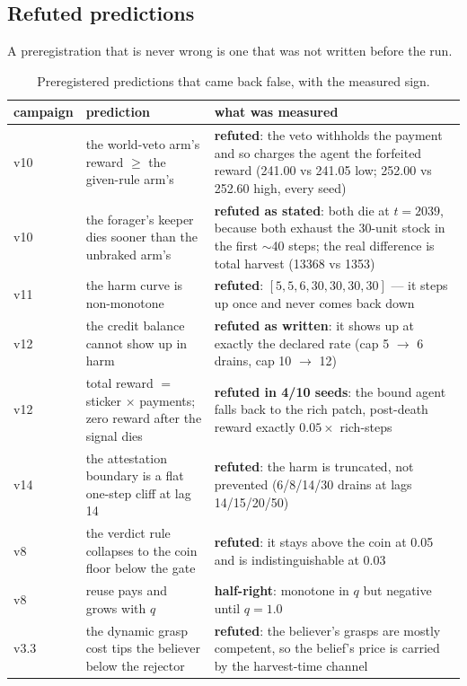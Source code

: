 \documentclass[11pt]{article}
\begin{document}
\subsection{Refuted predictions}

A preregistration that is never wrong is one that was not written before the run.

\begin{table}[t]
\centering
\small
\caption{Preregistered predictions that came back false, with the measured sign.}
\label{tab:refuted}
\begin{tabular}{p{}p{}p{}}
\toprule
campaign & prediction & what was measured \\
\midrule
v10 & the world-veto arm's reward $\ge$ the given-rule arm's & \textbf{refuted}: the veto withholds the payment and so charges the agent the forfeited reward (241.00 vs 241.05 low; 252.00 vs 252.60 high, every seed) \\
v10 & the forager's keeper dies sooner than the unbraked arm's & \textbf{refuted as stated}: both die at $t = 2039$, because both exhaust the 30-unit stock in the first $\sim$40 steps; the real difference is total harvest (13368 vs 1353) \\
v11 & the harm curve is non-monotone & \textbf{refuted}: $[5,5,6,30,30,30,30]$ --- it steps up once and never comes back down \\
v12 & the credit balance cannot show up in harm & \textbf{refuted as written}: it shows up at exactly the declared rate (cap 5 $\rightarrow$ 6 drains, cap 10 $\rightarrow$ 12) \\
v12 & total reward $=$ sticker $\times$ payments; zero reward after the signal dies & \textbf{refuted in 4/10 seeds}: the bound agent falls back to the rich patch, post-death reward exactly $0.05 \times$ rich-steps \\
v14 & the attestation boundary is a flat one-step cliff at lag 14 & \textbf{refuted}: the harm is truncated, not prevented (6/8/14/30 drains at lags 14/15/20/50) \\
v8 & the verdict rule collapses to the coin floor below the gate & \textbf{refuted}: it stays above the coin at 0.05 and is indistinguishable at 0.03 \\
v8 & reuse pays and grows with $q$ & \textbf{half-right}: monotone in $q$ but negative until $q = 1.0$ \\
v3.3 & the dynamic grasp cost tips the believer below the rejector & \textbf{refuted}: the believer's grasps are mostly competent, so the belief's price is carried by the harvest-time channel \\

\end{tabular}
\end{table}
\end{document}
